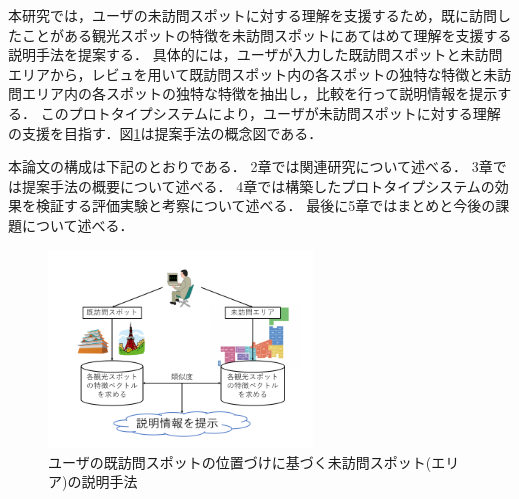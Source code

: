 \documentclass{deimj}
\begin{document}
本研究では，ユーザの未訪問スポットに対する理解を支援するため，既に訪問したことがある観光スポットの特徴を未訪問スポットにあてはめて理解を支援する説明手法を提案する．
具体的には，ユーザが入力した既訪問スポットと未訪問エリアから，レビュを用いて既訪問スポット内の各スポットの独特な特徴と未訪問エリア内の各スポットの独特な特徴を抽出し，比較を行って説明情報を提示する．
このプロトタイプシステムにより，ユーザが未訪問スポットに対する理解の支援を目指す．図\ref{fig:photo_image}は提案手法の概念図である．

本論文の構成は下記のとおりである．
2章では関連研究について述べる．
3章では提案手法の概要について述べる．
4章では構築したプロトタイプシステムの効果を検証する評価実験と考察について述べる．
最後に5章ではまとめと今後の課題について述べる．

\begin{figure}[t]
  \begin{center}
    \includegraphics[clip,width=7.0cm]{picture/Photo_Image_jap.png}
    \caption{ユーザの既訪問スポットの位置づけに基づく未訪問スポット(エリア)の説明手法}
    \label{fig:photo_image}
   \end{center}
\end{figure}


\end{document}
